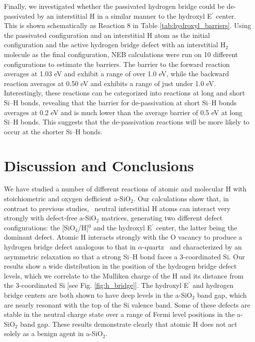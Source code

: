 \documentclass[aps,prb,reprint,superscriptaddress,showpacs]{revtex4-1}
\begin{document}
Finally, we investigated whether the passivated hydrogen bridge could be de-passivated by an interstitial H in a similar manner to the hydroxyl E$^\prime$ center. This is shown schematically as Reaction 8 in Table \ref{tab:hydroxyl_barriers}. Using the passivated configuration and an interstitial H atom as the initial configuration and the active hydrogen bridge defect with an interstitial H$_2$ molecule as the final configuration, NEB calculations were run on 10 different configurations to estimate the barriers. The barrier to the forward reaction  averages at 1.03 eV and exhibit a range of over 1.0 eV, while the backward reaction averages at 0.50 eV and exhibits a range of just under 1.0 eV. Interestingly, these reactions can be categorized into reactions at long and short \mbox{Si--H} bonds, revealing that the barrier for de-passivation at short \mbox{Si--H} bonds averages at 0.2 eV and is much lower than the average barrier of 0.5 eV at long \mbox{Si--H} bonds. This suggests that the de-passivation reactions will be more likely to occur at the shorter \mbox{Si--H} bonds.

\section{Discussion and Conclusions}

We have studied a number of different reactions of atomic and molecular H with stoichiometric and oxygen defficient a-SiO$_2$. Our calculations show that, in contrast to previous studies,~\cite{blochl_vacancies,robertson_oxides,godet_hydrogen} neutral interstitial H atoms can interact very strongly with defect-free a-SiO$_2$ matrices, generating two different defect configurations: the [SiO$_4$/H]$^0$ and the hydroxyl E$^\prime$ center, the latter being the dominant defect. Atomic H interacts strongly with the O vacancy to produce a hydrogen bridge defect analogous to that in $\alpha$-quartz~\cite{blochl_vacancies} and characterized by an asymmetric relaxation so that a strong \mbox{Si--H} bond faces a 3-coordinated Si. Our results show a wide distribution in the position of the hydrogen bridge defect levels, which we correlate to the Mulliken charge of the H and its distance from the 3-coordinated Si [see Fig. \ref{fig:h_bridge}]. The hydroxyl E$^\prime$ and hydrogen bridge centers are both shown to have deep levels in the a-SiO$_2$ band gap, which are nearly resonant with the top of the Si valence band. Some of these defects are stable in the neutral charge state over a range of Fermi level positions in the a-SiO$_2$ band gap. These results demonstrate clearly that atomic H does not act solely as a benign agent in a-SiO$_2$.
\end{document}
